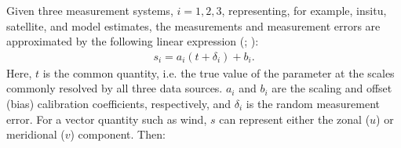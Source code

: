 \documentclass[a4paper,10pt,english]{sphinxmanual}
\begin{document}
\sphinxAtStartPar
Given three measurement systems, \(i=1,2,3\), representing, for example,
in\sphinxhyphen{}situ, satellite, and model estimates, the measurements and measurement
errors are approximated by the following linear expression
({\hyperref[\detokenize{alg-02-validation:ref-vogelzang-quadruple-collocation}]{}};
{\hyperref[\detokenize{alg-02-validation:ref-vogelzang-quintuple-collocation}]{}}):
\begin{equation}\label{equation:alg-02-validation:eq-cvtdd-tc-linear-model}
\begin{split}s_i=a_i(t+\delta_i)+b_i .\end{split}
\end{equation}
\sphinxAtStartPar
Here, \(t\) is the common quantity, i.e. the true value of the parameter
at the scales commonly resolved by all three data sources. \(a_i\) and
\(b_i\) are the scaling and offset (bias) calibration coefficients,
respectively, and \(\delta_i\) is the random measurement error. For a
vector quantity such as wind, \(s\) can represent either the zonal
(\(u\)) or meridional (\(v\)) component. Then:
\end{document}
